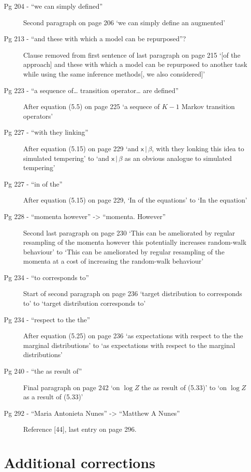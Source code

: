 \documentclass[10pt,a4paper]{article}
\begin{document}
\begin{description}
\item[
  Pg 204 - ``we can simply defined'']
  Second paragraph on page 206 `we can simply define an augmented'
\item[
  Pg 213 - ``and these with which a model can be repurposed''?]
  Clause removed from first sentence of last paragraph on page 215 `[of the approach] and these with which a model can be repurposed to another task while using the same inference methods[, we also considered]'
\item[
  Pg 223 - ``a sequence of\ldots{} transition operator\ldots{} are
  defined'']
  After equation (5.5) on page 225 `a sequece of $K-1$ Markov transition operators'
\item[
  Pg 227 - ``with they linking'']
  After equation (5.15) on page 229 `and $\boldsymbol{\mathsf{x}} \,|\, \beta$, with they lonking this idea to simulated tempering' to `and $\boldsymbol{\mathsf{x}} \,|\, \beta$ as an obvious analogue to simulated tempering'
\item[
  Pg 227 - ``in of the'']
  After equation (5.15) on page 229, `In of the equations' to `In the equation'
\item[
  Pg 228 - ``momenta however'' -\textgreater{} ``momenta. However'']
  Second last paragraph on page 230 `This can be ameliorated by regular resampling of the momenta however this potentially increases random-walk behaviour' to `This can be ameliorated by regular resampling of the momenta at a cost of increasing the random-walk behaviour'
\item[
  Pg 234 - ``to corresponds to'']
  Start of second paragraph on page 236 `target distribution to corresponds to' to `target distribution corresponds to'
\item[
  Pg 234 - ``respect to the the'']
  After equation (5.25) on page 236 `as expectations with respect to the the marginal distributions' to `as expectations with respect to the marginal distributions'
\item[
  Pg 240 - ``the as result of'']
  Final paragraph on page 242 `on $\log Z$ the as result of (5.33)' to `on $\log Z$ as a result of (5.33)'
\item[
  Pg 292 - ``Maria Antonieta Nunes'' -\textgreater{} ``Matthew A Nunes'']
  Reference [44], last entry on page 296.
\end{description}

\section*{Additional corrections}
\end{document}
